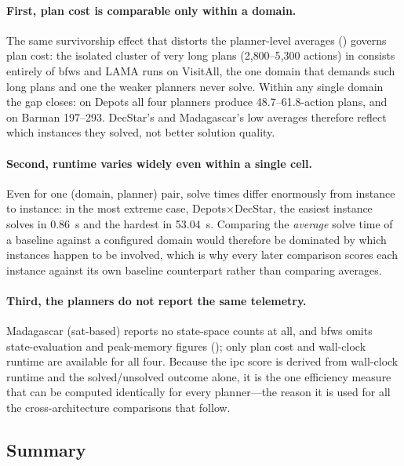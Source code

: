 \paragraph{First, plan cost is comparable only within a domain.}
The same survivorship effect that distorts the planner-level averages () governs plan cost: the isolated cluster of very long plans (2{,}800--5{,}300 actions) in  consists entirely of \gls{bfws} and LAMA runs on VisitAll, the one domain that demands such long plans and one the weaker planners never solve.
Within any single domain the gap closes: on Depots all four planners produce 48.7--61.8-action plans, and on Barman 197--293.
DecStar's and Madagascar's low averages therefore reflect which instances they solved, not better solution quality.

\paragraph{Second, runtime varies widely even within a single cell.}
Even for one (domain, planner) pair, solve times differ enormously from instance to instance: in the most extreme case, Depots$\times$DecStar, the easiest instance solves in 0.86~s and the hardest in 53.04~s.
Comparing the \emph{average} solve time of a baseline against a configured domain would therefore be dominated by which instances happen to be involved, which is why every later comparison scores each instance against its own baseline counterpart rather than comparing averages.

\paragraph{Third, the planners do not report the same telemetry.}
Madagascar (\gls{sat}-based) reports no state-space counts at all, and \gls{bfws} omits state-evaluation and peak-memory figures (); only plan cost and wall-clock runtime are available for all four.
Because the \gls{ipc} score is derived from wall-clock runtime and the solved/unsolved outcome alone, it is the one efficiency measure that can be computed identically for every planner---the reason it is used for all the cross-architecture comparisons that follow.

\subsection{Summary}
\label{sec:results:stage0:synthesis}

